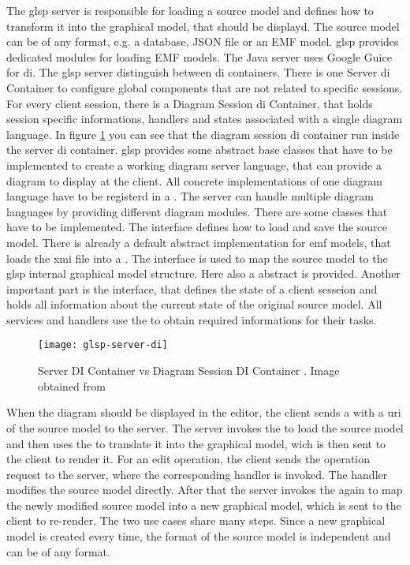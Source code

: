   The \ac{glsp} server is responsible for loading a source model and defines how to transform it into the graphical model, that should be displayd. The source model can be of any format, e.g. a database, JSON file or an EMF model. \ac{glsp} provides dedicated modules for loading EMF models. The Java server uses Google Guice \cite{guice-repo} for \ac{di}. The \ac{glsp} server distinguish between \ac{di} containers. There is one Server \ac{di} Container to configure global components that are not related to specific sessions. For every client session, there is a Diagram Session \ac{di} Container, that holds session specific informations, handlers and states associated with a single diagram language. In figure \ref{fig:glsp-server-di} you can see that the diagram session \ac{di} container run inside the server \ac{di} container. \ac{glsp} provides some abstract base classes that have to be implemented to create a working diagram server language, that can provide a diagram to display at the client. All concrete implementations of one diagram language have to be registerd in a . The server can handle multiple diagram languages by providing different diagram modules. There are some classes that have to be implemented. The interface  defines how to load and save the source model. There is already a default abstract  implementation for \ac{emf} models, that loads the \ac{xmi} file into a . The interface  is used to map the source model to the \ac{glsp} internal graphical model structure. Here also a abstract  is provided. Another important part is the  interface, that defines the state of a client sesseion and holds all information about the current state of the original source model. All services and handlers use the  to obtain required informations for their tasks.


   \begin{figure}[h]
    \centering
    \texttt{[image: glsp-server-di]}
    \caption{Server DI Container vs Diagram Session DI Container
        . Image obtained from \cite{glsp-doc}}
    \label{fig:glsp-server-di}
  \end{figure}

  When the diagram should be displayed in the editor, the client sends a  with a \acs{uri} of the source model to the server. The server invokes the  to load the source model and then uses the  to translate it into the graphical model, wich is then sent to the client to render it. For an edit operation, the client sends the operation request to the server, where the corresponding handler is invoked. The handler modifies the source model directly. After that the server invokes the  again to map the newly modified source model into a new graphical model, which is sent to the client to re-render. The two use cases share many steps. Since a new graphical model is created every time, the format of the source model is independent and can be of any format.\cite{glsp-doc}

